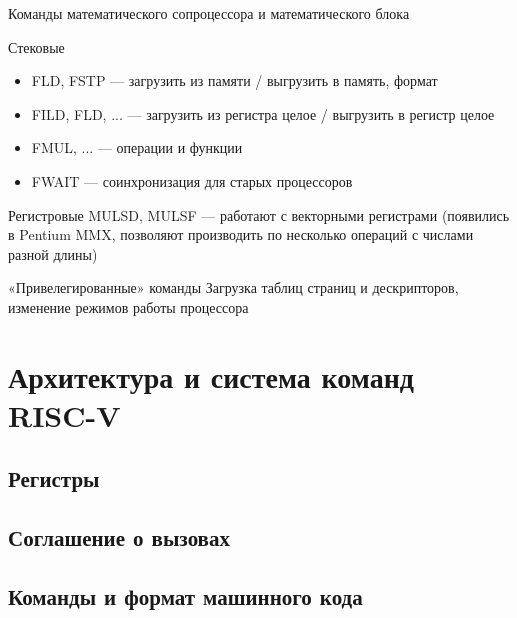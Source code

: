 \documentclass[xetex,aspectratio=43]{beamer}
\begin{document}
\begin{frame}{Команды математического сопроцессора и математического блока}
    \begin{block}{Стековые}
        \begin{itemize}
        \tightlist
        \item
        FLD, FSTP --- загрузить из памяти / выгрузить в память, формат
        \item
        FILD, FLD, ... --- загрузить из регистра целое / выгрузить в регистр целое
        \item
        FMUL, ... --- операции и функции
        \item
        FWAIT --- соинхронизация для старых процессоров
        \end{itemize}
    \end{block}
    \begin{block}{Регистровые}
        MULSD, MULSF --- работают с векторными регистрами (появились в Pentium MMX, позволяют производить по несколько операций с числами разной длины)
    \end{block}
\end{frame}

\begin{frame}{«Привелегированные» команды}
        Загрузка таблиц страниц и дескрипторов, изменение режимов работы
        процессора
\end{frame}


\section{Архитектура и система команд RISC-V}

\subsection{Регистры}

\subsection{Соглашение о вызовах}

\subsection{Команды и формат машинного кода}

\end{document}

